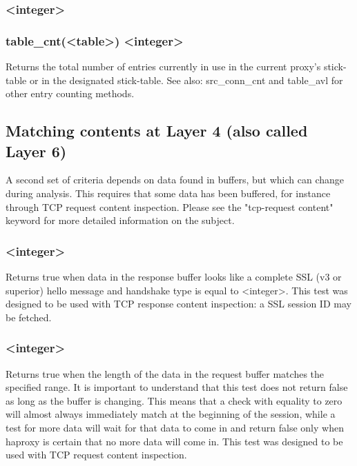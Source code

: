 \subsubsection[table\_cnt]{ <integer>}
\subsubsection*{table\_cnt(<table>) <integer>}

Returns the total number of entries currently in use in the current proxy's
stick-table or in the designated stick-table.
See also: src\_conn\_cnt and
table\_avl for other entry counting methods.

\subsection{Matching contents at Layer 4 (also called Layer 6)}
\label{sec:matching_layer4}

A second set of criteria depends on data found in buffers, but which can change
during analysis. This requires that some data has been buffered, for instance
through TCP request content inspection. Please see the "tcp-request content"
keyword for more detailed information on the subject.

\subsubsection[rep\_ssl\_hello\_type]{ <integer>}

  Returns true when data in the response buffer looks like a complete SSL (v3
  or superior) hello message and handshake type is equal to <integer>.
  This test was designed to be used with TCP response content inspection: a
  SSL session ID may be fetched.

\subsubsection[req\_len]{ <integer>}

  Returns true when the length of the data in the request buffer matches the
  specified range. It is important to understand that this test does not
  return false as long as the buffer is changing. This means that a check with
  equality to zero will almost always immediately match at the beginning of the
  session, while a test for more data will wait for that data to come in and
  return false only when haproxy is certain that no more data will come in.
  This test was designed to be used with TCP request content inspection.

